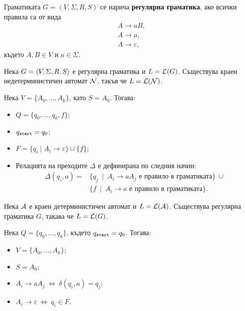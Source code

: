 Граматиката $G = (V, \Sigma, R, S)$ се нарича {\bf регулярна граматика},
ако всички правила са от вида 
\begin{align*}
  & A \to aB,\\
  & A \to a,\\
  & A \to \varepsilon,
\end{align*}
където $A, B \in V$ и $a \in \Sigma$.  

\begin{prop}
  Нека $G = \langle{V,\Sigma,R,S}\rangle$ е регулярна граматика и $L = \mathcal{L}(G)$.
  Съществува краен недетерминистичен автомат $\mathcal{N}$, такъв че $L = \mathcal{L}(\mathcal{N})$.
\end{prop}
\begin{hint}
  Нека $V = \{A_0,\dots,A_k\}$, като $S = A_0$. Тогава:
  \begin{itemize}
  \item
    $Q = \{q_0,\dots,q_k,f\}$;
  \item
    $q_{\texttt{start}} = q_0$;
  \item
    $F = \{q_i \mid A_i \to \varepsilon\} \cup \{f\}$;
  \item
    Релацията на преходите $\Delta$ е дефинирана по следния начин:
    \begin{align*}
      \Delta(q_i,a) = & \{ q_j\ \mid\ A_i \to aA_j \text{ е правило в граматиката}\}\ \cup\\
                      & \{ f\ \mid\ A_i \to a \text{ е правило в граматиката}\}.
    \end{align*}
  \end{itemize}
\end{hint}

\begin{prop}
  Нека $\mathcal{A}$ е краен детерминистичен автомат и $L = \mathcal{L}(\mathcal{A})$.
  Съществува регулярна граматика $G$, такава че $L = \mathcal{L}(G)$.
\end{prop}
\begin{hint}
  Нека $Q = \{q_0,\dots,q_k\}$, където $q_{\texttt{start}} = q_0$. Тогава:
  \begin{itemize}
  \item 
    $V = \{A_0,\dots,A_k\}$;
  \item
    $S = A_0$;
  \item
    $A_i \to aA_j\ \iff\ \delta(q_i,a) = q_j$;
  \item
    $A_{i} \to \varepsilon\ \iff\ q_{i} \in F$.
  \end{itemize}
\end{hint}


